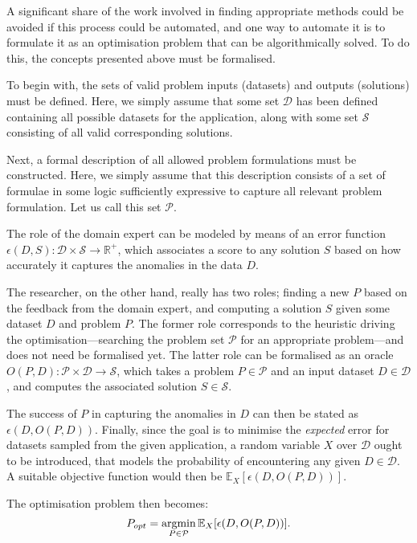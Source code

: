 A significant share of the work involved in finding appropriate methods could be avoided if this process could be automated, and one way to automate it is to formulate it as an optimisation problem that can be algorithmically solved. To do this, the concepts presented above must be formalised.

To begin with, the sets of valid problem inputs (datasets) and outputs (solutions) must be defined. Here, we simply assume that some set $\mathcal{D}$ has been defined containing all possible datasets for the application, along with some set $\mathcal{S}$ consisting of all valid corresponding solutions.

Next, a formal description of all allowed problem formulations must be constructed. Here, we simply assume that this description consists of a set of formulae in some logic sufficiently expressive to capture all relevant problem formulation. Let us call this set $\mathcal{P}$.

The role of the domain expert can be modeled by means of an error function $\epsilon(D, S): \mathcal{D} \times \mathcal{S} \rightarrow \mathbb{R}^+$, which associates a score to any solution $S$ based on how accurately it captures the anomalies in the data $D$.

The researcher, on the other hand, really has two roles; finding a new $P$ based on the feedback from the domain expert, and computing a solution $S$ given some dataset $D$ and problem $P$. The former role corresponds to the heuristic driving the optimisation---searching the problem set $\mathcal{P}$ for an appropriate problem---and does not need be formalised yet. The latter role can be formalised as an oracle $O(P, D): \mathcal{P} \times \mathcal{D} \rightarrow \mathcal{S}$, which takes a problem $P \in \mathcal{P}$ and an input dataset $D \in \mathcal{D}$, and computes the associated solution $S \in \mathcal{S}$.

The success of $P$ in capturing the anomalies in $D$ can then be stated as $\epsilon(D, O(P, D))$. Finally, since the goal is to minimise the \emph{expected} error for datasets sampled from the given application, a random variable $X$ over $\mathcal{D}$ ought to be introduced, that models the probability of encountering any given $D \in \mathcal{D}$. A suitable objective function would then be $\mathbb{E}_X [\epsilon(D, O(P, D))]$.

The optimisation problem then becomes:
\[
    P_{opt} = \argmin_{P \in \mathcal{P}}\mathbb{E}_X [ \epsilon(D, O(P, D)) ].
\]

